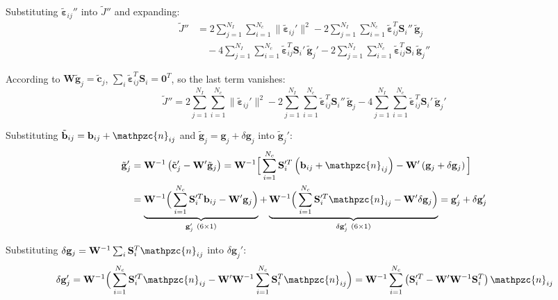 \documentclass[11pt]{article}
\newcommand{\nn}{\mathpzc{n}}   %
\begin{document}
Substituting $\tilde{\boldsymbol{\varepsilon}}_{ij}''$ into $\tilde{J}''$ and expanding:
\[
\begin{aligned}
\tilde{J}''&=2\sum_{j=1}^{N_I}\sum_{i=1}^{N_c}\|\tilde{\boldsymbol{\varepsilon}}_{ij}'\|^{2}
-2\sum_{j=1}^{N_I}\sum_{i=1}^{N_c}\tilde{\boldsymbol{\varepsilon}}_{ij}^{T}\mathbf{S}_i''\,\tilde{\mathbf{g}}_j\\
&\quad-4\sum_{j=1}^{N_I}\sum_{i=1}^{N_c}\tilde{\boldsymbol{\varepsilon}}_{ij}^{T}\mathbf{S}_i'\,\tilde{\mathbf{g}}_j'
-2\sum_{j=1}^{N_I}\sum_{i=1}^{N_c}\tilde{\boldsymbol{\varepsilon}}_{ij}^{T}\mathbf{S}_i\,\tilde{\mathbf{g}}_j''
\end{aligned}
\]

According to $\mathbf{W}\tilde{\mathbf{g}}_j=\tilde{\mathbf{c}}_j$,
$\sum_{i}\tilde{\boldsymbol{\varepsilon}}_{ij}^{T}\mathbf{S}_i=\mathbf{0}^{T}$, so the last term vanishes:
\[
\tilde{J}''=2\sum_{j=1}^{N_I}\sum_{i=1}^{N_c}\|\tilde{\boldsymbol{\varepsilon}}_{ij}'\|^{2}
-2\sum_{j=1}^{N_I}\sum_{i=1}^{N_c}\tilde{\boldsymbol{\varepsilon}}_{ij}^{T}\mathbf{S}_i''\,\tilde{\mathbf{g}}_j
-4\sum_{j=1}^{N_I}\sum_{i=1}^{N_c}\tilde{\boldsymbol{\varepsilon}}_{ij}^{T}\mathbf{S}_i'\,\tilde{\mathbf{g}}_j'
\]

Substituting $\tilde{\mathbf{b}}_{ij}=\mathbf{b}_{ij}+\nn_{ij}$ and $\tilde{\mathbf{g}}_j=\mathbf{g}_j+\delta\mathbf{g}_j$ into $\tilde{\mathbf{g}}_j'$:
\[
\begin{aligned}
\tilde{\mathbf{g}}_j'&=\mathbf{W}^{-1}\left(\tilde{\mathbf{c}}_j'-\mathbf{W}'\tilde{\mathbf{g}}_j\right)
=\mathbf{W}^{-1}\Big[\sum_{i=1}^{N_c}\mathbf{S}_i'^{T}\left(\mathbf{b}_{ij}+\nn_{ij}\right)-\mathbf{W}'\left(\mathbf{g}_j+\delta\mathbf{g}_j\right)\Big]\\
&=\underbrace{\mathbf{W}^{-1}\Big(\sum_{i=1}^{N_c}\mathbf{S}_i'^{T}\mathbf{b}_{ij}-\mathbf{W}'\mathbf{g}_j\Big)}_{\mathbf{g}_j'\ (6\times1)}
+\underbrace{\mathbf{W}^{-1}\Big(\sum_{i=1}^{N_c}\mathbf{S}_i'^{T}\nn_{ij}-\mathbf{W}'\delta\mathbf{g}_j\Big)}_{\delta\mathbf{g}_j'\ (6\times1)}
=\mathbf{g}_j'+\delta\mathbf{g}_j'
\end{aligned}
\]

Substituting $\delta\mathbf{g}_j=\mathbf{W}^{-1}\sum_{i}\mathbf{S}_i^{T}\nn_{ij}$ into $\delta\mathbf{g}_j'$:
\[
\delta\mathbf{g}_j'=\mathbf{W}^{-1}\Big(\sum_{i=1}^{N_c}\mathbf{S}_i'^{T}\nn_{ij}-\mathbf{W}'\mathbf{W}^{-1}\sum_{i=1}^{N_c}\mathbf{S}_i^{T}\nn_{ij}\Big)
=\mathbf{W}^{-1}\sum_{i=1}^{N_c}\left(\mathbf{S}_i'^{T}-\mathbf{W}'\mathbf{W}^{-1}\mathbf{S}_i^{T}\right)\nn_{ij}
\]
\end{document}
